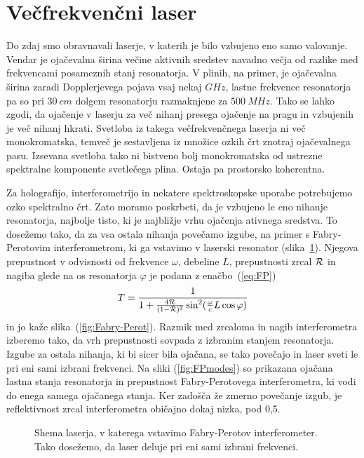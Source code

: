 \section{Večfrekvenčni laser}
Do zdaj smo obravnavali laserje, v katerih je bilo vzbujeno eno samo
valovanje. Vendar je ojačevalna širina večine aktivnih sredstev 
navadno večja od razlike med frekvencami posameznih 
stanj resonatorja. V plinih, na primer, je ojačevalna širina zaradi 
Dopplerjevega pojava vsaj nekaj $\si{GHz}$, lastne frekvence resonatorja 
pa so pri $30~\si{cm}$ dolgem resonatorju razmaknjene za $500~\si{MHz}$. 
Tako se lahko zgodi, da ojačenje v laserju za več nihanj
presega ojačenje na pragu in vzbujenih je več nihanj hkrati.
Svetloba iz takega večfrekvenčnega laserja ni več monokromatska,
temveč je sestavljena iz množice ozkih črt znotraj ojačevalnega pasu.
Izsevana svetloba tako ni bistveno bolj monokromatska od ustrezne spektralne 
komponente svetlečega plina. Ostaja pa prostorsko koherentna.

Za holografijo, interferometrijo in nekatere spektroskopske uporabe
potrebujemo ozko spektralno črt. Zato moramo poskrbeti, da je vzbujeno le
eno nihanje resonatorja, najbolje tisto, ki je najbližje vrhu ojačenja
ativnega sredstva. To dosežemo tako, da za vsa ostala nihanja povečamo izgube, 
na primer s Fabry-Perotovim interferometrom, ki ga vstavimo v laserski resonator
(slika~\ref{fig:FPres}). Njegova prepustnost v odvisnosti od frekvence $\omega$, debeline $L$,
prepustnosti zrcal ${\cal R}$ in nagiba glede na os resonatorja $\varphi$ 
je podana z enačbo~(\ref{eq:FP}) 
\begin{equation}
T=\frac{1}{1+\frac{4{\cal {R}}}{(1-{\cal {R}})^{2}}\sin^{2}(\frac{\omega}{c}L\cos \varphi )}
\label{5.22}
\end{equation}
in jo kaže slika~(\ref{fig:Fabry-Perot}). Razmik med zrcaloma in nagib interferometra
izberemo tako, da vrh prepustnosti sovpada z izbranim stanjem resonatorja. 
Izgube za ostala nihanja, ki bi sicer bila ojačana, se tako povečajo in laser
sveti le pri eni sami izbrani frekvenci. Na sliki 
(\ref{fig:FPmodes}) so prikazana ojačana lastna stanja resonatorja in prepustnost
Fabry-Perotovega interferometra, ki vodi do enega samega ojačanega stanja. 
Ker zadošča že zmerno povečanje izgub, je reflektivnost zrcal interferometra 
običajno dokaj nizka, pod 0,5. 

\begin{figure}[h]
\centering
\def\svgwidth{90truemm} 

\caption{Shema laserja, v katerega vstavimo Fabry-Perotov interferometer. Tako dosežemo,
da laser deluje pri eni sami izbrani frekvenci.}
\label{fig:FPres}
\end{figure}

